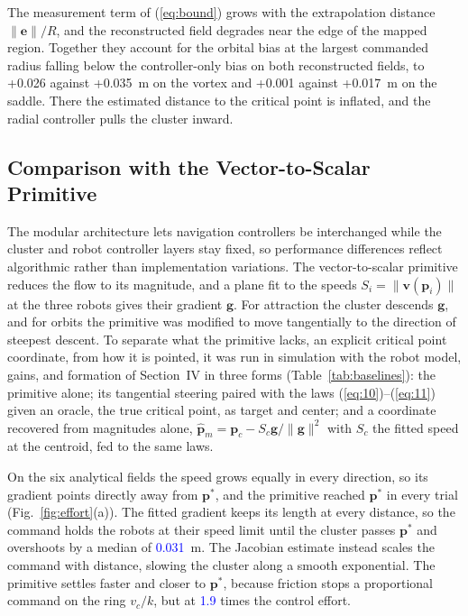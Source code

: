 \documentclass[lettersize,journal]{IEEEtran}
\newcommand{\rev}[1]{#1}
\newcommand{\newnum}[1]{\textcolor{blue}{#1}}
\begin{document}
The measurement term of (\ref{eq:bound}) grows with the extrapolation distance $\|\mathbf{e}\|/R$, and the reconstructed field degrades near the edge of the mapped region. Together they account for the orbital bias at the largest commanded radius falling below the controller-only bias on both reconstructed fields, to \rev{+0.026} against \rev{+0.035}~m on the vortex and \rev{+0.001} against \rev{+0.017}~m on the saddle. There the estimated distance to the critical point is inflated, and the radial controller pulls the cluster inward.

\subsection{Comparison with the Vector-to-Scalar Primitive}

The modular architecture lets navigation controllers be interchanged while the cluster and robot controller layers stay fixed, so performance differences reflect algorithmic rather than implementation variations.
The vector-to-scalar primitive \cite{48} reduces the flow to its magnitude, and a plane fit to the speeds $S_i = \|\mathbf{v}(\mathbf{p}_i)\|$ at the three robots gives their gradient $\mathbf{g}$. For attraction the cluster descends $\mathbf{g}$, and for orbits the primitive was modified to move tangentially to the direction of steepest descent. To separate what the primitive lacks, an explicit critical point coordinate, from how it is pointed, it was run in simulation with the robot model, gains, and formation of Section~IV in three forms (Table~\ref{tab:baselines}): the primitive alone; its tangential steering paired with the laws (\ref{eq:10})--(\ref{eq:11}) given an oracle, the true critical point, as target and center; and a coordinate recovered from magnitudes alone, $\hat{\mathbf{p}}_m = \mathbf{p}_c - S_c\mathbf{g}/\|\mathbf{g}\|^2$ with $S_c$ the fitted speed at the centroid, fed to the same laws.

On the six analytical fields the speed grows equally in every direction, so its gradient points directly away from $\mathbf{p}^*$, and the primitive reached $\mathbf{p}^*$ in every trial (Fig.~\ref{fig:effort}(a)). The fitted gradient keeps its length at every distance, so the command holds the robots at their speed limit until the cluster passes $\mathbf{p}^*$ and overshoots by a median of \newnum{0.031}~m. The Jacobian estimate instead scales the command with distance, slowing the cluster along a smooth exponential. The primitive settles faster and closer to $\mathbf{p}^*$, because friction stops a proportional command on the ring $v_c/k$, but at \newnum{1.9} times the control effort.
\end{document}
